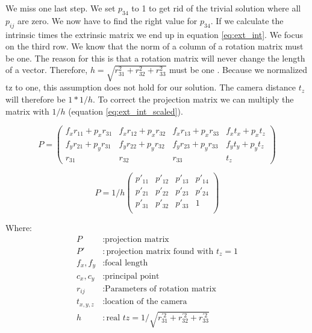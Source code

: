 \documentclass[11pt,a4paper,titlepage,oneside]{report}
\begin{document}
We miss one last step. We set $p_{34}$ to 1 to get rid of the trivial solution where all $p_{ij}$ are zero. We now have to find the right value for $p_{34}$. If we calculate the intrinsic times the extrinsic matrix we end up in equation \ref{eq:ext_int}. We focus on the third row. We know that the norm of a column of a rotation matrix must be one. The reason for this is that a rotation matrix will never change the length of a vector. Therefore, $h=\sqrt{r_{31}^2+r_{32}^2+r_{33}^2}$ must be one \cite{Wu}. Because we normalized tz to one, this assumption does not hold for our solution. The camera distance $t_z$ will therefore be $1*1/h$. To correct the projection matrix we can multiply the matrix with $1/h$ (equation \ref{eq:ext_int_scaled}).

\begin{equation}\label{eq:ext_int}
	P=
	\begin{pmatrix}
		f_xr_{11}+p_xr_{31} & f_xr_{12}+p_xr_{32} & f_xr_{13}+p_xr_{33} & f_xt_x+p_xt_z\\
		f_yr_{21}+p_yr_{31} & f_yr_{22}+p_yr_{32} & f_yr_{23}+p_yr_{33} & f_yt_y+p_yt_z\\
		r_{31} & r_{32} & r_{33} & t_z
	\end{pmatrix}
\end{equation}

\begin{equation}\label{eq:ext_int_scaled}
	P=1/h
	\begin{pmatrix}
		p'_{11} & p'_{12} & p'_{13} & p'_{14}\\
		p'_{21} & p'_{22} & p'_{23} & p'_{24}\\
		p'_{31} & p'_{32} & p'_{33} & 1\\
	\end{pmatrix}
\end{equation}

Where:
\begin{align*}
	P					&: \text{projection matrix}\\
	P'				&: \text{projection matrix found with $t_z=1$}\\
	f_x,f_y		&: \text{focal length}\\
	c_x,c_y		&: \text{principal point}\\
	r_{ij}		&: \text{Parameters of rotation matrix}\\
	t_{x,y,z}	&: \text{location of the camera}\\
	h					&: \text{real $tz=1/\sqrt{r_{31}^{'2}+r_{32}^{'2}+r_{33}^{'2}}$}
\end{align*}
\end{document}
